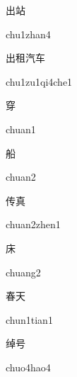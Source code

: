 \begin{multicols*}{2}
\begin{verbete}{出站}
\begin{pronuncia}{chu1zhan4}
\end{pronuncia}
\end{verbete}

\begin{verbete}{出租汽车}
\begin{pronuncia}{chu1zu1qi4che1}
\end{pronuncia}
\end{verbete}

\begin{verbete}[chuan1]{穿}
\begin{pronuncia}{chuan1}
\end{pronuncia}
\end{verbete}

\begin{verbete}[chuan2]{船}
\begin{pronuncia}{chuan2}
\end{pronuncia}
\end{verbete}

\begin{verbete}{传真}
\begin{pronuncia}{chuan2zhen1}
\end{pronuncia}
\end{verbete}

\begin{verbete}[chuang2]{床}
\begin{pronuncia}{chuang2}
\end{pronuncia}
\end{verbete}

\begin{verbete}{春天}
\begin{pronuncia}{chun1tian1}
\end{pronuncia}
\end{verbete}

\begin{verbete}{绰号}
\begin{pronuncia}{chuo4hao4}
\end{pronuncia}
\end{verbete}


\end{multicols*}
